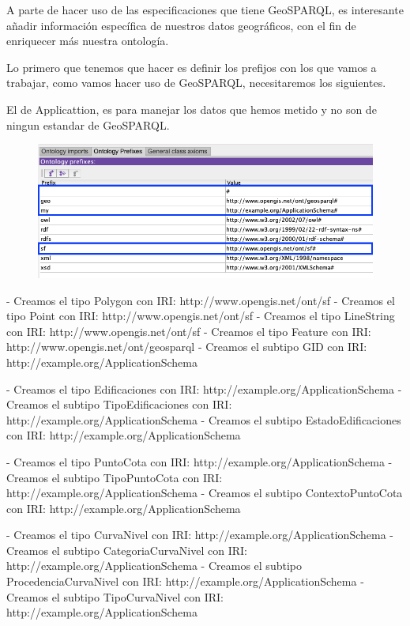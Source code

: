 A parte de hacer uso de las especificaciones que tiene GeoSPARQL, es interesante añadir información específica de nuestros datos geográficos, con el fin de enriquecer más nuestra ontología.


Lo primero que tenemos que hacer es definir los prefijos con los que vamos a trabajar, como vamos hacer uso de GeoSPARQL, necesitaremos los siguientes.
 
 El de Applicattion, es para manejar los datos que hemos metido y no son de ningun estandar de GeoSPARQL.

\begin{figure}[H]
	\centering
	\includegraphics[width=0.7\linewidth]{imagenes/capitulo4/prefijos}
	\caption{}
	\label{fig:prefijos}
\end{figure}


- Creamos el tipo Polygon con IRI: http://www.opengis.net/ont/sf
- Creamos el tipo Point con IRI: http://www.opengis.net/ont/sf
- Creamos el tipo LineString con IRI: http://www.opengis.net/ont/sf
- Creamos el tipo Feature con IRI: http://www.opengis.net/ont/geosparql
- Creamos el subtipo GID con IRI: http://example.org/ApplicationSchema

- Creamos el tipo Edificaciones con IRI: http://example.org/ApplicationSchema
- Creamos el subtipo TipoEdificaciones con IRI: http://example.org/ApplicationSchema
- Creamos el subtipo EstadoEdificaciones con IRI: http://example.org/ApplicationSchema

- Creamos el tipo PuntoCota con IRI: http://example.org/ApplicationSchema
- Creamos el subtipo TipoPuntoCota con IRI: http://example.org/ApplicationSchema
- Creamos el subtipo ContextoPuntoCota con IRI: http://example.org/ApplicationSchema

- Creamos el tipo CurvaNivel con IRI: http://example.org/ApplicationSchema
- Creamos el subtipo CategoriaCurvaNivel con IRI: http://example.org/ApplicationSchema
- Creamos el subtipo ProcedenciaCurvaNivel con IRI: http://example.org/ApplicationSchema
- Creamos el subtipo TipoCurvaNivel con IRI: http://example.org/ApplicationSchema

